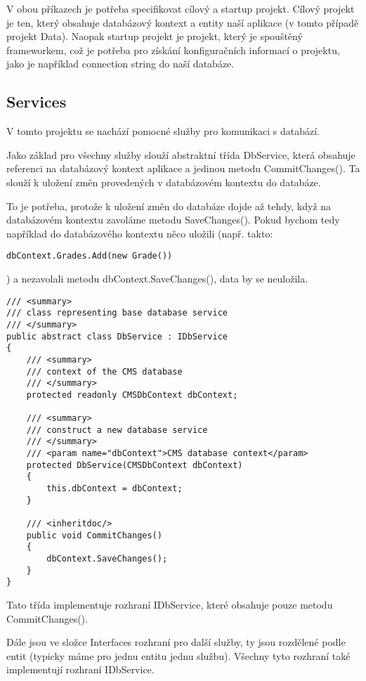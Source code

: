 V obou příkazech je potřeba specifikovat cílový a startup projekt. Cílový projekt je ten, který obsahuje databázový kontext a entity naší aplikace (v tomto případě projekt Data). Naopak startup projekt je projekt, který je spouštěný frameworkem, což je potřeba pro získání konfiguračních informací o projektu, jako je například connection string do naší databáze.

\newpage

\subsection{Services}
V tomto projektu se nachází pomocné služby pro komunikaci s databází. 

Jako základ pro všechny služby slouží abstraktní třída DbService, která obsahuje referenci na databázový kontext aplikace a jedinou metodu CommitChanges(). Ta slouží k uložení změn provedených v databázovém kontextu do databáze. 

To je potřeba, protože k uložení změn do databáze dojde až tehdy, když na databázovém kontextu zavoláme metodu SaveChanges(). Pokud bychom tedy například do databázového kontextu něco uložili (např. takto: 
\begin{lstlisting}
dbContext.Grades.Add(new Grade())
\end{lstlisting})
a nezavolali metodu dbContext.SaveChanges(), data by se neuložila.

\begin{lstlisting}
/// <summary>
/// class representing base database service
/// </summary>
public abstract class DbService : IDbService
{
	/// <summary>
	/// context of the CMS database
	/// </summary>
	protected readonly CMSDbContext dbContext;
	
	/// <summary>
	/// construct a new database service
	/// </summary>
	/// <param name="dbContext">CMS database context</param>
	protected DbService(CMSDbContext dbContext)
	{
		this.dbContext = dbContext;
	}
	
	/// <inheritdoc/>
	public void CommitChanges()
	{
		dbContext.SaveChanges();
	}
}
\end{lstlisting}

Tato třída implementuje rozhraní IDbService, které obsahuje pouze metodu CommitChanges().

Dále jsou ve složce Interfaces rozhraní pro další služby, ty jsou rozdělené podle entit (typicky máme pro jednu entitu jednu službu). Všechny tyto rozhraní také implementují rozhraní IDbService. 

